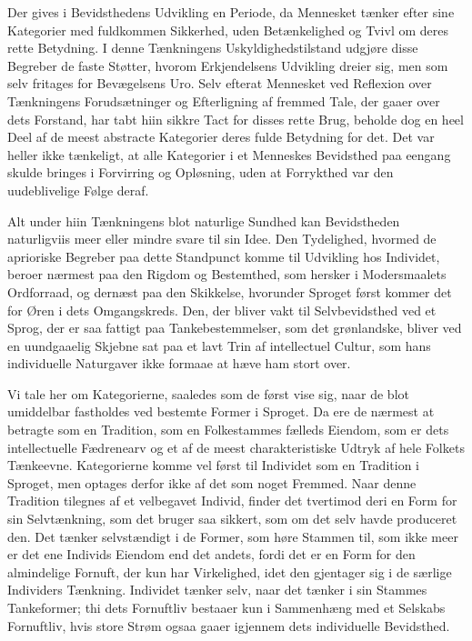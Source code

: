 \documentclass[12pt]{article}
\newcommand{\opage}[1]{\marginnote{\footnotesize\textit{[#1]}}}
\begin{document}
Der gives i Bevidsthedens Udvikling en Periode, da Mennesket tænker efter sine
Kategorier med fuldkommen Sikkerhed, uden Betænkelighed og Tvivl om deres rette
Betydning. I denne Tænkningens Uskyldighedstilstand udgjøre disse Begreber de
faste Støtter, hvorom Erkjendelsens Udvikling dreier sig, men som selv fritages
for Bevægelsens Uro. Selv efterat Mennesket ved \opage{197}Reflexion over
Tænkningens Forudsætninger og Efterligning af fremmed Tale, der gaaer over dets
Forstand, har tabt hiin sikkre Tact for disses rette Brug, beholde dog en heel
Deel af de meest abstracte Kategorier deres fulde Betydning for det. Det var
heller ikke tænkeligt, at alle Kategorier i et Menneskes Bevidsthed paa eengang
skulde bringes i Forvirring og Opløsning, uden at Forrykthed var den
uudeblivelige Følge deraf.

Alt under hiin Tænkningens blot naturlige Sundhed kan Bevidstheden naturligviis
meer eller mindre svare til sin Idee. Den Tydelighed, hvormed de aprioriske
Begreber paa dette Standpunct komme til Udvikling hos Individet, beroer nærmest
paa den Rigdom og Bestemthed, som hersker i Modersmaalets Ordforraad, og dernæst
paa den Skikkelse, hvorunder Sproget først kommer det for Øren i dets
Omgangskreds. Den, der bliver vakt til Selvbevidsthed ved et Sprog, der er saa
fattigt paa Tankebestemmelser, som det grønlandske, bliver ved en uundgaaelig
Skjebne sat paa et lavt Trin af intellectuel Cultur, som hans individuelle
Naturgaver ikke formaae at hæve ham stort over.

Vi tale her om Kategorierne, saaledes som de først vise sig, naar de blot
umiddelbar fastholdes ved bestemte Former i Sproget. Da ere de nærmest at
betragte som en Tradition, som en Folkestammes fælleds Eiendom, som er dets
intellectuelle Fædrenearv og et af de meest charakteristiske Udtryk af hele
Folkets Tænkeevne. Kategorierne komme vel først til Individet som en Tradition i
Sproget, men optages derfor ikke af det som noget Fremmed. Naar denne Tradition
tilegnes af et velbegavet Individ, finder det tvertimod deri en Form for sin
Selvtænkning, som det bruger saa sikkert, som om det selv havde produceret den.
Det tænker selvstændigt i de Former, som høre Stammen til, som ikke meer er det
ene Individs Eiendom end det andets, fordi det er en Form for den almindelige
Fornuft, der kun har Virkelighed, idet den gjentager sig i de særlige Individers
Tænkning. \opage{198}Individet tænker selv, naar det tænker i sin Stammes
Tankeformer; thi dets Fornuftliv bestaaer kun i Sammenhæng med et Selskabs
Fornuftliv, hvis store Strøm ogsaa gaaer igjennem dets individuelle Bevidsthed.
\end{document}
